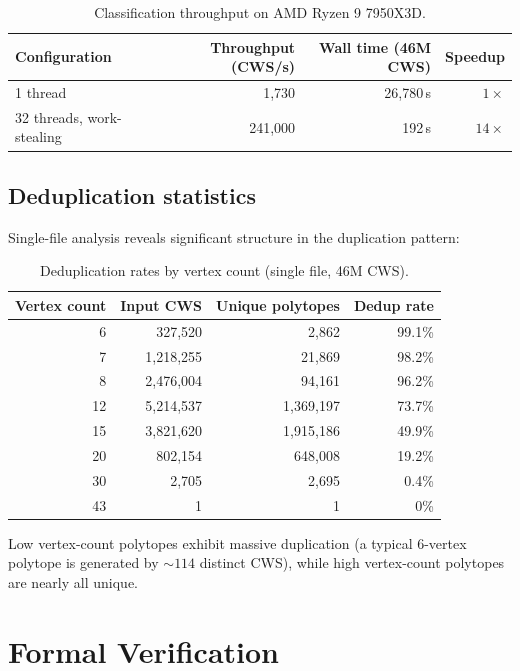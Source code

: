 \documentclass[12pt,a4paper]{article}
\theoremstyle{definition}
\begin{document}
\begin{table}[h]
\centering
\caption{Classification throughput on AMD Ryzen 9 7950X3D.}
\label{tab:throughput}
\begin{tabular}{@{}lrrr@{}}
\toprule
Configuration & Throughput (CWS/s) & Wall time (46M CWS) & Speedup \\
\midrule
1 thread                & 1,730  & 26,780\,s & $1\times$ \\
32 threads, work-stealing & 241,000 & 192\,s  & $14\times$ \\
\bottomrule
\end{tabular}
\end{table}

\subsection{Deduplication statistics}

Single-file analysis reveals significant structure in the duplication
pattern:

\begin{table}[h]
\centering
\caption{Deduplication rates by vertex count (single file, 46M CWS).}
\label{tab:dedup}
\begin{tabular}{@{}rrrr@{}}
\toprule
Vertex count & Input CWS & Unique polytopes & Dedup rate \\
\midrule
6  & 327,520   & 2,862     & 99.1\% \\
7  & 1,218,255 & 21,869    & 98.2\% \\
8  & 2,476,004 & 94,161    & 96.2\% \\
12 & 5,214,537 & 1,369,197 & 73.7\% \\
15 & 3,821,620 & 1,915,186 & 49.9\% \\
20 & 802,154   & 648,008   & 19.2\% \\
30 & 2,705     & 2,695     & 0.4\% \\
43 & 1         & 1         & 0\% \\
\bottomrule
\end{tabular}
\end{table}

Low vertex-count polytopes exhibit massive duplication (a typical
6-vertex polytope is generated by $\sim 114$ distinct CWS), while
high vertex-count polytopes are nearly all unique.

\section{Formal Verification}
\label{sec:verification}
\end{document}
